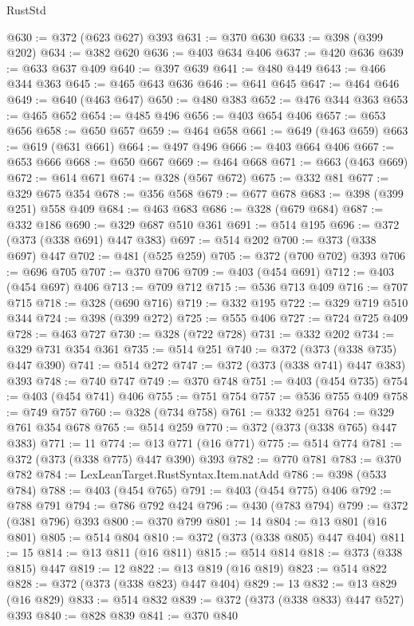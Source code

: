 \begin{lexlean}{RustStd}
\begin{coremodule}
@630 := @372 (@623 @627) @393
@631 := @370 @630
@633 := @398 (@399 @202)
@634 := @382 @620
@636 := @403 @634 @406
@637 := @420 @636
@639 := @633 @637 @409
@640 := @397 @639
@641 := @480 @449
@643 := @466 @344 @363
@645 := @465 @643 @636
@646 := @641 @645
@647 := @464 @646
@649 := @640 (@463 @647)
@650 := @480 @383
@652 := @476 @344 @363
@653 := @465 @652
@654 := @485 @496
@656 := @403 @654 @406
@657 := @653 @656
@658 := @650 @657
@659 := @464 @658
@661 := @649 (@463 @659)
@663 := @619 (@631 @661)
@664 := @497 @496
@666 := @403 @664 @406
@667 := @653 @666
@668 := @650 @667
@669 := @464 @668
@671 := @663 (@463 @669)
@672 := @614 @671
@674 := @328 (@567 @672)
@675 := @332 @81
@677 := @329 @675 @354
@678 := @356 @568
@679 := @677 @678
@683 := @398 (@399 @251) @558 @409
@684 := @463 @683
@686 := @328 (@679 @684)
@687 := @332 @186
@690 := @329 @687 @510 @361
@691 := @514 @195
@696 := @372 (@373 (@338 @691) @447 @383)
@697 := @514 @202
@700 := @373 (@338 @697) @447
@702 := @481 (@525 @259)
@705 := @372 (@700 @702) @393
@706 := @696 @705
@707 := @370 @706
@709 := @403 (@454 @691)
@712 := @403 (@454 @697) @406
@713 := @709 @712
@715 := @536 @713 @409
@716 := @707 @715
@718 := @328 (@690 @716)
@719 := @332 @195
@722 := @329 @719 @510 @344
@724 := @398 (@399 @272)
@725 := @555 @406
@727 := @724 @725 @409
@728 := @463 @727
@730 := @328 (@722 @728)
@731 := @332 @202
@734 := @329 @731 @354 @361
@735 := @514 @251
@740 := @372 (@373 (@338 @735) @447 @390)
@741 := @514 @272
@747 := @372 (@373 (@338 @741) @447 @383) @393
@748 := @740 @747
@749 := @370 @748
@751 := @403 (@454 @735)
@754 := @403 (@454 @741) @406
@755 := @751 @754
@757 := @536 @755 @409
@758 := @749 @757
@760 := @328 (@734 @758)
@761 := @332 @251
@764 := @329 @761 @354 @678
@765 := @514 @259
@770 := @372 (@373 (@338 @765) @447 @383)
@771 := 11
@774 := @13 @771 (@16 @771)
@775 := @514 @774
@781 := @372 (@373 (@338 @775) @447 @390) @393
@782 := @770 @781
@783 := @370 @782
@784 := LexLeanTarget.RustSyntax.Item.natAdd
@786 := @398 (@533 @784)
@788 := @403 (@454 @765)
@791 := @403 (@454 @775) @406
@792 := @788 @791
@794 := @786 @792 @424
@796 := @430 (@783 @794)
@799 := @372 (@381 @796) @393
@800 := @370 @799
@801 := 14
@804 := @13 @801 (@16 @801)
@805 := @514 @804
@810 := @372 (@373 (@338 @805) @447 @404)
@811 := 15
@814 := @13 @811 (@16 @811)
@815 := @514 @814
@818 := @373 (@338 @815) @447
@819 := 12
@822 := @13 @819 (@16 @819)
@823 := @514 @822
@828 := @372 (@373 (@338 @823) @447 @404)
@829 := 13
@832 := @13 @829 (@16 @829)
@833 := @514 @832
@839 := @372 (@373 (@338 @833) @447 @527) @393
@840 := @828 @839
@841 := @370 @840

\end{coremodule}
\end{lexlean}
